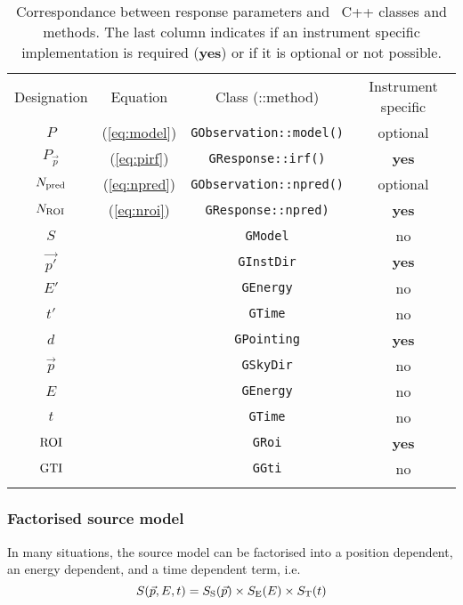 \documentclass{article}[12pt,a4]
\begin{document}
\begin{table}[!h]
\caption{Correspondance between response parameters and \this\ C++ classes
and methods.
The last column indicates if an instrument specific implementation is required
({\bf yes}) or if it is optional or not possible.
\label{tab:pars}}
\begin{center}
\begin{tabular}{cccc}
\hline
\hline
\noalign{\smallskip}
Designation & Equation & Class (::method) & Instrument specific \\
\noalign{\smallskip}
\hline
\noalign{\smallskip}
$P$ & (\ref{eq:model}) & {\tt GObservation::model()} & optional \\
$P_{\vec{p}}$ & (\ref{eq:pirf}) & {\tt GResponse::irf()} & {\bf yes} \\
$N_{\rm pred}$ & (\ref{eq:npred}) & {\tt GObservation::npred()} & optional \\
$N_{\rm ROI}$ & (\ref{eq:nroi}) & {\tt GResponse::npred)} & {\bf yes} \\
$S$ & & {\tt GModel} & no \\ 
$\vec{p'}$ & & {\tt GInstDir} & {\bf yes} \\
$E'$ & & {\tt GEnergy} & no \\
$t'$ & & {\tt GTime} & no \\
$d$ & & {\tt GPointing} & {\bf yes} \\
$\vec{p}$ & & {\tt GSkyDir} & no \\
$E$ & & {\tt GEnergy} & no \\
$t$ & & {\tt GTime} & no \\
${\rm ROI}$ & & {\tt GRoi} & {\bf yes} \\
${\rm GTI}$ & & {\tt GGti} & no \\
\noalign{\smallskip}
\hline
\end{tabular}
\end{center}
\end{table}


\subsubsection{Factorised source model}

In many situations, the source model can be factorised into a position dependent, an energy
dependent, and a time dependent term, i.e.
\begin{equation}
S(\vec{p}, E, t) = S_{\rm S}(\vec{p}) \times S_{\rm E}(E) \times S_{\rm T}(t)
\label{eq:source}
\end{equation}
\end{document}
